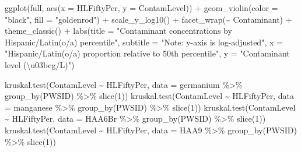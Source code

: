 \documentclass[
  letterpaper,
  DIV=11,
  numbers=noendperiod]{scrartcl}
\newenvironment{Shaded}{\begin{snugshade}}{\end{snugshade}}
\newcommand{\AttributeTok}[1]{\textcolor[rgb]{0.40,0.45,0.13}{#1}}
\newcommand{\DecValTok}[1]{\textcolor[rgb]{0.68,0.00,0.00}{#1}}
\newcommand{\FunctionTok}[1]{\textcolor[rgb]{0.28,0.35,0.67}{#1}}
\newcommand{\NormalTok}[1]{\textcolor[rgb]{0.00,0.23,0.31}{#1}}
\newcommand{\SpecialCharTok}[1]{\textcolor[rgb]{0.37,0.37,0.37}{#1}}
\newcommand{\StringTok}[1]{\textcolor[rgb]{0.13,0.47,0.30}{#1}}
\begin{document}
\begin{Shaded}
\begin{Highlighting}[]
\FunctionTok{ggplot}\NormalTok{(full, }\FunctionTok{aes}\NormalTok{(}\AttributeTok{x =}\NormalTok{ HLFiftyPer, }\AttributeTok{y =}\NormalTok{ ContamLevel)) }\SpecialCharTok{+}
  \FunctionTok{geom\_violin}\NormalTok{(}\AttributeTok{color =} \StringTok{"black"}\NormalTok{, }\AttributeTok{fill =} \StringTok{"goldenrod"}\NormalTok{) }\SpecialCharTok{+}
  \FunctionTok{scale\_y\_log10}\NormalTok{() }\SpecialCharTok{+}
  \FunctionTok{facet\_wrap}\NormalTok{(}\SpecialCharTok{\textasciitilde{}}\NormalTok{ Contaminant) }\SpecialCharTok{+}
  \FunctionTok{theme\_classic}\NormalTok{() }\SpecialCharTok{+}
  \FunctionTok{labs}\NormalTok{(}\AttributeTok{title =} \StringTok{"Contaminant concentrations by Hispanic/Latin(o/a) percentile"}\NormalTok{,}
       \AttributeTok{subtitle =} \StringTok{"Note: y{-}axis is log{-}adjusted"}\NormalTok{,}
       \AttributeTok{x =} \StringTok{"Hispanic/Latin(o/a) proportion relative to 50th percentile"}\NormalTok{,}
       \AttributeTok{y =} \StringTok{"Contaminant level (\textbackslash{}u03bcg/L)"}\NormalTok{)}
\end{Highlighting}
\end{Shaded}

\begin{Shaded}
\begin{Highlighting}[]
\FunctionTok{kruskal.test}\NormalTok{(ContamLevel }\SpecialCharTok{\textasciitilde{}}\NormalTok{ HLFiftyPer, }\AttributeTok{data =}\NormalTok{ germanium }\SpecialCharTok{\%\textgreater{}\%} \FunctionTok{group\_by}\NormalTok{(PWSID) }\SpecialCharTok{\%\textgreater{}\%} \FunctionTok{slice}\NormalTok{(}\DecValTok{1}\NormalTok{))}
\FunctionTok{kruskal.test}\NormalTok{(ContamLevel }\SpecialCharTok{\textasciitilde{}}\NormalTok{ HLFiftyPer, }\AttributeTok{data =}\NormalTok{ manganese }\SpecialCharTok{\%\textgreater{}\%} \FunctionTok{group\_by}\NormalTok{(PWSID) }\SpecialCharTok{\%\textgreater{}\%} \FunctionTok{slice}\NormalTok{(}\DecValTok{1}\NormalTok{))}
\FunctionTok{kruskal.test}\NormalTok{(ContamLevel }\SpecialCharTok{\textasciitilde{}}\NormalTok{ HLFiftyPer, }\AttributeTok{data =}\NormalTok{ HAA6Br }\SpecialCharTok{\%\textgreater{}\%} \FunctionTok{group\_by}\NormalTok{(PWSID) }\SpecialCharTok{\%\textgreater{}\%} \FunctionTok{slice}\NormalTok{(}\DecValTok{1}\NormalTok{))}
\FunctionTok{kruskal.test}\NormalTok{(ContamLevel }\SpecialCharTok{\textasciitilde{}}\NormalTok{ HLFiftyPer, }\AttributeTok{data =}\NormalTok{ HAA9 }\SpecialCharTok{\%\textgreater{}\%} \FunctionTok{group\_by}\NormalTok{(PWSID) }\SpecialCharTok{\%\textgreater{}\%} \FunctionTok{slice}\NormalTok{(}\DecValTok{1}\NormalTok{))}
\end{Highlighting}
\end{Shaded}
\end{document}
